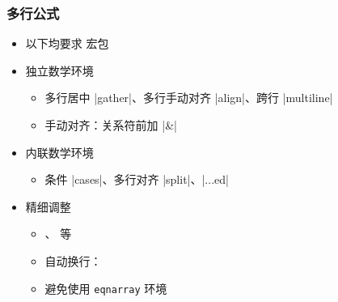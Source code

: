 \begin{frame}[fragile]
\frametitle{多行公式}
\begin{itemize}
  \item 以下均要求  宏包
  \item 独立数学环境

    \begin{itemize}
      \item 多行居中 |gather|、多行手动对齐 |align|、跨行 |multiline|
      \item 手动对齐：关系符前加 |&|
    \end{itemize}

  \item 内联数学环境

    \begin{itemize}
      \item 条件 |cases|、多行对齐 |split|、|...ed|
    \end{itemize} \pause

  \item 精细调整

    \begin{itemize}
      \item {}、 等
      \item 自动换行：
      \item \alert{避免使用 \texttt{eqnarray} 环境}
    \end{itemize}
\end{itemize}
\end{frame}

